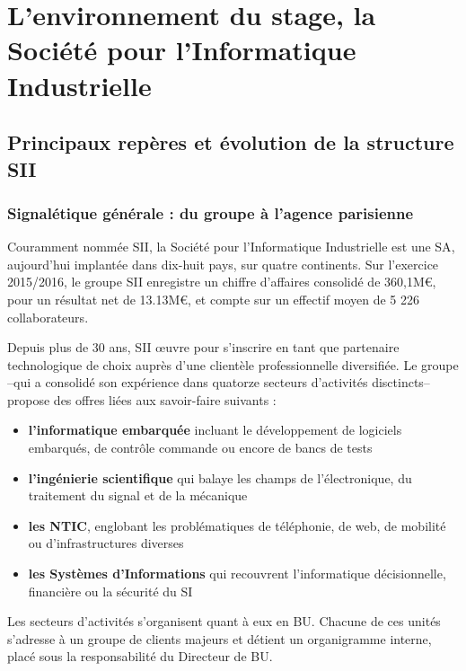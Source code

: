 \chapter{L'environnement du stage, la Société pour l'Informatique Industrielle}

\section{Principaux repères et évolution de la structure SII}

\subsection{Signalétique générale : du groupe à l'agence parisienne}

Couramment nommée \gls{SII}, la Société pour l'Informatique Industrielle est une \gls{SA}, aujourd'hui implantée dans dix-huit pays, sur quatre continents.
Sur l'exercice 2015/2016, le groupe SII enregistre un chiffre d'affaires consolidé de 360,1M\euro\cite{Bib_exercice_2015_2016}, pour un résultat net de 13.13M\euro\cite{Bib_exercice_2015_2016}, et compte sur un effectif moyen de 5 226 collaborateurs\cite{Bib_exercice_2015_2016}. 

Depuis plus de 30 ans\cite{Bib_exercice_2015_2016}\cite{Bib_memento_ag_idf}, SII \oe{}uvre pour s'inscrire en tant que partenaire technologique de choix auprès d'une clientèle professionnelle diversifiée. 
Le groupe --qui a consolidé son expérience dans quatorze secteurs d'activités disctincts-- propose des offres liées aux savoir-faire suivants : 

\begin{itemize}
 \item \textbf{l'informatique embarquée} incluant le développement de logiciels embarqués, de contrôle commande ou encore de bancs de tests   
 \item \textbf{l'ingénierie scientifique} qui balaye les champs de l'électronique, du traitement du signal et de la mécanique
 \item \textbf{les \gls{NTIC}}, englobant les problématiques de téléphonie, de web, de mobilité ou d'infrastructures diverses
 \item \textbf{les Systèmes d'Informations} qui recouvrent l'informatique décisionnelle, financière ou la sécurité du \gls{SI}
\end{itemize}

Les secteurs d'activités s'organisent quant à eux en \gls{BU}. Chacune de ces unités s'adresse à un groupe de clients majeurs et détient un organigramme interne, placé sous la responsabilité du Directeur de \gls{BU}. 

